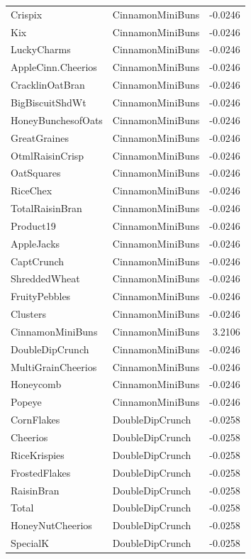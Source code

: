\begin{longtable}{llr}
Crispix & CinnamonMiniBuns & -0.0246 \\
Kix & CinnamonMiniBuns & -0.0246 \\
LuckyCharms & CinnamonMiniBuns & -0.0246 \\
AppleCinn.Cheerios & CinnamonMiniBuns & -0.0246 \\
CracklinOatBran & CinnamonMiniBuns & -0.0246 \\
BigBiscuitShdWt & CinnamonMiniBuns & -0.0246 \\
HoneyBunchesofOats & CinnamonMiniBuns & -0.0246 \\
GreatGraines & CinnamonMiniBuns & -0.0246 \\
OtmlRaisinCrisp & CinnamonMiniBuns & -0.0246 \\
OatSquares & CinnamonMiniBuns & -0.0246 \\
RiceChex & CinnamonMiniBuns & -0.0246 \\
TotalRaisinBran & CinnamonMiniBuns & -0.0246 \\
Product19 & CinnamonMiniBuns & -0.0246 \\
AppleJacks & CinnamonMiniBuns & -0.0246 \\
CaptCrunch & CinnamonMiniBuns & -0.0246 \\
ShreddedWheat & CinnamonMiniBuns & -0.0246 \\
FruityPebbles & CinnamonMiniBuns & -0.0246 \\
Clusters & CinnamonMiniBuns & -0.0246 \\
CinnamonMiniBuns & CinnamonMiniBuns & 3.2106 \\
DoubleDipCrunch & CinnamonMiniBuns & -0.0246 \\
MultiGrainCheerios & CinnamonMiniBuns & -0.0246 \\
Honeycomb & CinnamonMiniBuns & -0.0246 \\
Popeye & CinnamonMiniBuns & -0.0246 \\
CornFlakes & DoubleDipCrunch & -0.0258 \\
Cheerios & DoubleDipCrunch & -0.0258 \\
RiceKrispies & DoubleDipCrunch & -0.0258 \\
FrostedFlakes & DoubleDipCrunch & -0.0258 \\
RaisinBran & DoubleDipCrunch & -0.0258 \\
Total & DoubleDipCrunch & -0.0258 \\
HoneyNutCheerios & DoubleDipCrunch & -0.0258 \\
SpecialK & DoubleDipCrunch & -0.0258 \\

\end{longtable}
